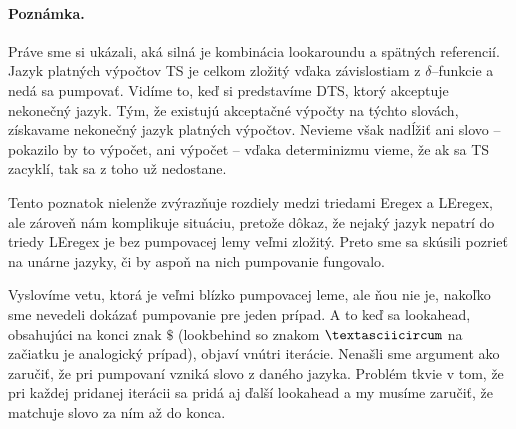 \paragraph{Poznámka.} Práve sme si ukázali, aká silná je kombinácia lookaroundu a spätných referencií. Jazyk platných výpočtov TS je celkom zložitý vďaka závislostiam z $\delta$--funkcie a nedá sa pumpovať. Vidíme to, keď si predstavíme DTS, ktorý akceptuje nekonečný jazyk. Tým, že existujú akceptačné výpočty na týchto slovách, získavame nekonečný jazyk platných výpočtov. Nevieme však nadĺžiť ani slovo -- pokazilo by to výpočet, ani výpočet -- vďaka determinizmu vieme, že ak sa TS zacyklí, tak sa z toho už nedostane.

Tento poznatok nielenže zvýrazňuje rozdiely medzi triedami Eregex a LEregex, ale zároveň nám komplikuje situáciu, pretože dôkaz, že nejaký jazyk nepatrí do triedy LEregex je bez pumpovacej lemy veľmi zložitý. Preto sme sa skúsili pozrieť na unárne jazyky, či by aspoň na nich pumpovanie fungovalo.

Vyslovíme vetu, ktorá je veľmi blízko pumpovacej leme, ale ňou nie je, nakoľko sme nevedeli dokázať pumpovanie pre jeden prípad. A to keď sa lookahead, obsahujúci na konci znak $\mathdollar$ (lookbehind so znakom $\textasciicircum$ na začiatku je analogický prípad), objaví vnútri iterácie. Nenašli sme argument ako zaručiť, že pri pumpovaní vzniká slovo z daného jazyka. Problém tkvie v tom, že pri každej pridanej iterácii sa pridá aj ďalší lookahead a my musíme zaručiť, že matchuje slovo za ním až do konca.

